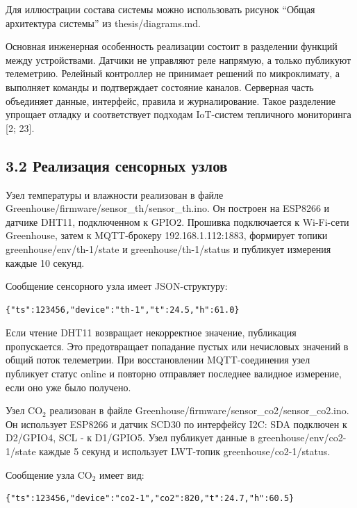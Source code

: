 \documentclass[a4paper,14pt]{extarticle}
\renewcommand{\texttt}[1]{\textnormal{#1}}
\begin{document}
Для иллюстрации состава системы можно использовать рисунок ``Общая
архитектура системы'' из \texttt{thesis/diagrams.md}.

Основная инженерная особенность реализации состоит в разделении функций
между устройствами. Датчики не управляют реле напрямую, а только
публикуют телеметрию. Релейный контроллер не принимает решений по
микроклимату, а выполняет команды и подтверждает состояние каналов.
Серверная часть объединяет данные, интерфейс, правила и журналирование.
Такое разделение упрощает отладку и соответствует подходам IoT-систем
тепличного мониторинга {[}2; 23{]}.

\subsection{3.2 Реализация сенсорных
узлов}\label{ux440ux435ux430ux43bux438ux437ux430ux446ux438ux44f-ux441ux435ux43dux441ux43eux440ux43dux44bux445-ux443ux437ux43bux43eux432}

Узел температуры и влажности реализован в файле
\texttt{Greenhouse/firmware/sensor\_th/sensor\_th.ino}. Он построен на
ESP8266 и датчике DHT11, подключенном к GPIO2. Прошивка подключается к
Wi-Fi-сети \texttt{Greenhouse}, затем к MQTT-брокеру
\texttt{192.168.1.112:1883}, формирует топики
\texttt{greenhouse/env/th-1/state} и \texttt{greenhouse/th-1/status} и
публикует измерения каждые 10 секунд.

Сообщение сенсорного узла имеет JSON-структуру:

\begin{verbatim}
{"ts":123456,"device":"th-1","t":24.5,"h":61.0}
\end{verbatim}

Если чтение DHT11 возвращает некорректное значение, публикация
пропускается. Это предотвращает попадание пустых или нечисловых значений
в общий поток телеметрии. При восстановлении MQTT-соединения узел
публикует статус \texttt{online} и повторно отправляет последнее
валидное измерение, если оно уже было получено.

Узел CO\(_2\) реализован в файле
\texttt{Greenhouse/firmware/sensor\_co2/sensor\_co2.ino}. Он использует
ESP8266 и датчик SCD30 по интерфейсу I2C: SDA подключен к D2/GPIO4, SCL
- к D1/GPIO5. Узел публикует данные в
\texttt{greenhouse/env/co2-1/state} каждые 5 секунд и использует
LWT-топик \texttt{greenhouse/co2-1/status}.

Сообщение узла CO\(_2\) имеет вид:

\begin{verbatim}
{"ts":123456,"device":"co2-1","co2":820,"t":24.7,"h":60.5}
\end{verbatim}
\end{document}
